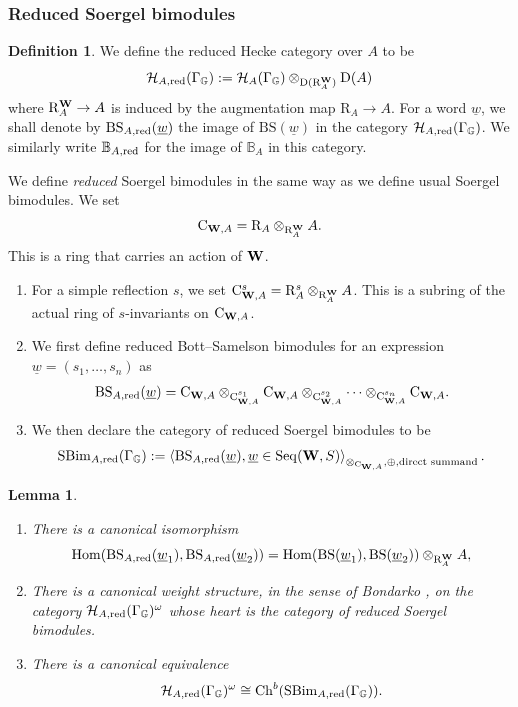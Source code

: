 \documentclass[a4paper, 10pt, oneside, reqno]{amsart}
\theoremstyle{plain}
\newtheorem{lem}[thm]{Lemma}
\theoremstyle{definition}
\newtheorem{defi}[thm]{Definition}
\theoremstyle{remark}
\newcommand{\Gbb}{\mathbb{G}}
\newcommand{\RR}{\mathrm{R}}
\newcommand{\BS}{\mathrm{BS}}
\newcommand{\Cc}{\mathrm{C}}
\newcommand{\Seq}{\mathrm{Seq}}
\begin{document}
\subsubsection{Reduced Soergel bimodules}

\begin{defi}
We define the reduced Hecke category over $A$ to be 
$$\Hcal_{A,\red}(\Gamma_{\Gbb}) := \Hcal_{A}(\Gamma_{\Gbb}) \otimes_{\DD(\RR_A^{\Wbf})} \DD(A)$$
where $\RR_A^{\Wbf} \to A$ is induced by the augmentation map $\RR_A \to A$. 
For a word $\underline{w}$, we shall denote by $\BS_{A,\red}(\underline{w})$ the image of $\BS(\underline{w})$ in the category $\Hcal_{A,\red}(\Gamma_{\Gbb})$.  We similarly write $\mathbb{B}_{A,\mathrm{red}}$ for the image of $\mathbb{B}_A$ in this category.
\end{defi}

We define \emph{reduced} Soergel bimodules in the same way as we define usual Soergel bimodules. We set 
$$\Cc_{\Wbf,A} = \RR_A \otimes_{\RR_A^{\Wbf}} A.$$
This is a ring that carries an action of $\mathbf{W}$.
\begin{enumerate}
\item For a simple reflection $s$, we set $\Cc_{\Wbf, A}^s = \RR_{A}^s \otimes_{\RR_A^{\Wbf}} A$. This is a subring of the actual ring of $s$-invariants on $\Cc_{\Wbf,A}$.
\item We first define reduced Bott--Samelson bimodules for an expression $\underline{w} = (s_1,\dots, s_n)$ as
$$\BS_{A, \red}(\underline{w}) = \Cc_{\Wbf,A} \otimes_{\Cc_{\Wbf, A}^{s_1}} \Cc_{\Wbf,A} \otimes_{\Cc_{\Wbf, A}^{s_2}} \dots  \otimes_{\Cc_{\Wbf, A}^{s_n}} \Cc_{\Wbf,A}.$$
\item We then declare the category of reduced Soergel bimodules to be 
$$\SBim_{A,\red}(\Gamma_{\Gbb}) := \left\langle \BS_{A, \red}(\underline{w}), \underline{w} \in \Seq(\Wbf,S) \right\rangle_{\otimes_{\Cc_{\Wbf,A}}, \oplus, \text{direct summand}}.$$
\end{enumerate}

\begin{lem}\label{lem:structure-reduced-hecke-cat}
\begin{enumerate}
\item There is a canonical isomorphism 
$$\Hom(\BS_{A,\red}(\underline{w}_1), \BS_{A,\red}(\underline{w}_2)) = \Hom(\BS(\underline{w}_1), \BS(\underline{w}_2)) \otimes_{\RR_A^{\Wbf}} A,$$
\item There is a canonical weight structure, in the sense of Bondarko \cite{Bondarko}, on the category $\Hcal_{A,\red}(\Gamma_{\Gbb})^{\omega}$ whose heart is the category of reduced Soergel bimodules. 
\item There is a canonical equivalence 
$$\Hcal_{A,\red}(\Gamma_{\Gbb})^{\omega} \cong \Ch^b(\SBim_{A,\red}(\Gamma_{\Gbb})).$$
\end{enumerate}
\end{lem}
\end{document}
